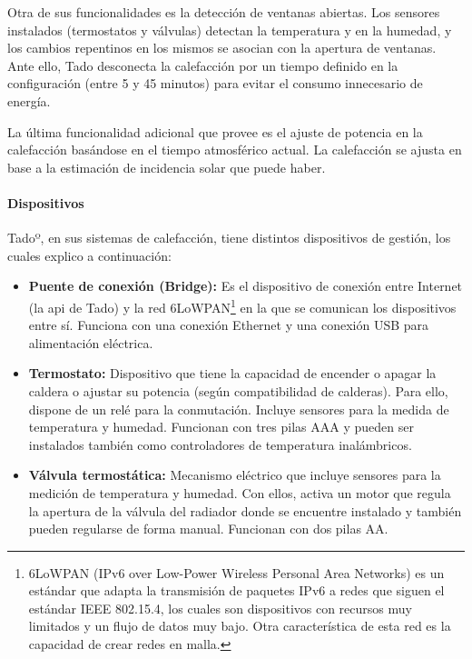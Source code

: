 \documentclass[spanish,12pt, a4paper, twoside]{paper}
\begin{document}
Otra de sus funcionalidades es la detección de ventanas abiertas. Los sensores instalados (termostatos y válvulas) detectan la temperatura y en la humedad, y los cambios repentinos en los mismos se asocian con la apertura de ventanas. Ante ello, Tado desconecta la calefacción por un tiempo definido en la configuración (entre 5 y 45 minutos) para evitar el consumo innecesario de energía.
\newline

La última funcionalidad adicional que provee es el ajuste de potencia en la calefacción basándose en el tiempo atmosférico actual. La calefacción se ajusta en base a la estimación de incidencia solar que puede haber.

\paragraph{Dispositivos}

Tadoº, en sus sistemas de calefacción, tiene distintos dispositivos de gestión, los cuales explico a continuación:

\begin{itemize}
\item\textbf{Puente de conexión (Bridge):} Es el dispositivo de conexión entre Internet (la api de Tado) y la red 6LoWPAN\footnote{6LoWPAN (IPv6 over Low-Power Wireless Personal Area Networks) es un estándar que adapta la transmisión de paquetes IPv6 a redes que siguen el estándar IEEE 802.15.4, los cuales son dispositivos con recursos muy limitados y un flujo de datos muy bajo. Otra característica de esta red es la capacidad de crear redes en malla.} en la que se comunican los dispositivos entre sí. Funciona con una conexión Ethernet y una conexión USB para alimentación eléctrica.

\item\textbf{Termostato:} Dispositivo que tiene la capacidad de encender o apagar la caldera o ajustar su potencia (según compatibilidad de calderas). Para ello, dispone de un relé para la conmutación. Incluye sensores para la medida de temperatura y humedad. Funcionan con tres pilas AAA y pueden ser instalados también como controladores de temperatura inalámbricos.

\item\textbf{Válvula termostática:} Mecanismo eléctrico que incluye sensores para la medición de temperatura y humedad. Con ellos, activa un motor que regula la apertura de la válvula del radiador donde se encuentre instalado y también pueden regularse de forma manual. Funcionan con dos pilas AA.
\end{itemize}
\end{document}
